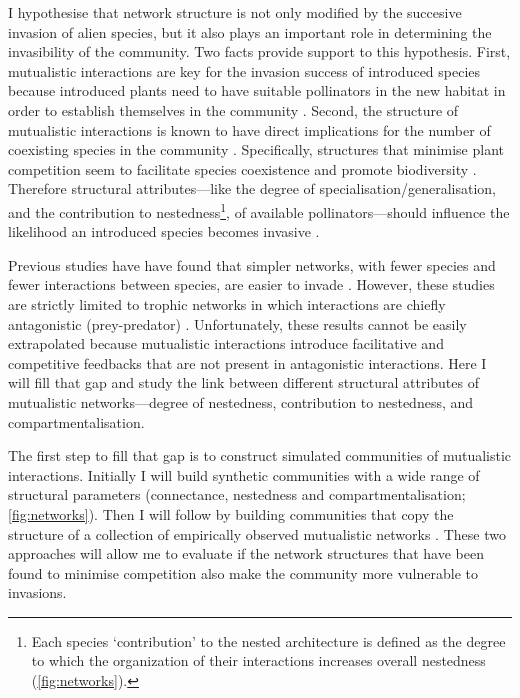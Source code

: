 \documentclass[a4paper]{article}
\begin{document}
I hypothesise that network structure is not only modified by the succesive invasion of alien species, but it also plays an important role in determining the invasibility of the community.
Two facts provide support to this hypothesis.
First, mutualistic interactions are key for the invasion success of introduced species because introduced plants need to have suitable pollinators in the new habitat in order to establish themselves in the community \autocite{Richardson2000, Sargent2008}.
Second, the structure of mutualistic interactions is known to have direct implications for the number of coexisting species in the community \autocite{Moeller2004, Bascompte2006, Bascompte2007, Bastolla2009}.
Specifically, structures that minimise plant competition seem to facilitate species coexistence and promote biodiversity \autocite{Bastolla2009}.
Therefore structural attributes---like the degree of specialisation/generalisation, and the contribution to nestedness\footnote{Each species ‘contribution’ to the nested architecture is defined as the degree to which the organization of their interactions increases overall nestedness\autocite{Saavedra2011} (\autoref{fig:networks}).}, of available pollinators---should influence the likelihood an introduced species becomes invasive \autocite{Stouffer2014}.

Previous studies have have found that simpler networks, with fewer species and fewer interactions between species, are easier to invade \autocite{Romanuk2009, Galiana2014}.
However, these studies are strictly limited to trophic networks in which interactions are chiefly antagonistic (prey-predator) \autocite{Romanuk2009, Baiser2010, Galiana2014}.
Unfortunately, these results cannot be easily extrapolated because mutualistic interactions introduce facilitative and competitive feedbacks that are not present in antagonistic interactions.
Here I will fill that gap and study the link between different structural attributes of mutualistic networks---degree of nestedness, contribution to nestedness, and compartmentalisation.

The first step to fill that gap is to construct simulated communities of mutualistic interactions.
Initially I will build synthetic communities with a wide range of structural parameters (connectance, nestedness and compartmentalisation; \autoref{fig:networks}).
Then I will follow by building communities that copy the structure of a collection of empirically observed mutualistic networks \autocite{Stouffer2014}.
These two approaches will allow me to evaluate if the network structures that have been found to minimise competition also make the community more vulnerable to invasions.
\end{document}
